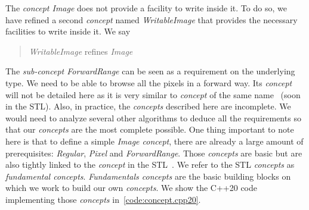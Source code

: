 The \emph{concept Image} does not provide a facility to write inside it. To do so, we have refined a second
\emph{concept} named \emph{WritableImage} that provides the necessary facilities to write inside it. We say
\blockquote{\emph{WritableImage} refines \emph{Image}}.

The \emph{sub-concept ForwardRange} can be seen as a requirement on the underlying type. We need to be able to browse
all the pixels in a forward way. Its \emph{concept} will not be detailed here as it is very similar to \emph{concept} of
the same name~\parencite{niebler.2018.mergingranges,niebler.2018.deepranges} (soon in the STL). Also, in practice, the
\emph{concepts} described here are incomplete. We would need to analyze several other algorithms to deduce all the
requirements so that our \emph{concepts} are the most complete possible. One thing important to note here is that to
define a simple \emph{Image concept}, there are already a large amount of prerequisites:
\label{term:regular}\emph{Regular}, \emph{Pixel} and \emph{ForwardRange}. Those \emph{concepts} are basic but are also
tightly linked to the \emph{concept} in the STL~\parencite{carter.2018.concepts}. We refer to the STL \emph{concepts} as
\emph{fundamental concepts}. \emph{Fundamentals concepts} are the basic building blocks on which we work to build our
own \emph{concepts}. We show the C++20 code implementing those \emph{concepts} in~\ref{code:concept.cpp20}.

